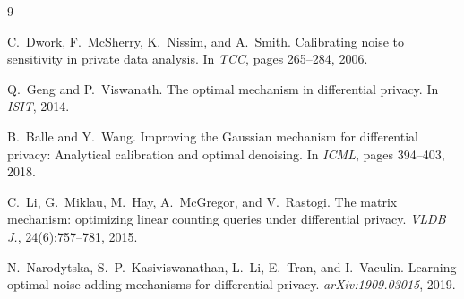 \documentclass[11pt,a4paper]{article}
\begin{document}

\begin{thebibliography}{9}

C.~Dwork, F.~McSherry, K.~Nissim, and A.~Smith.
\newblock Calibrating noise to sensitivity in private data analysis.
\newblock In \emph{TCC}, pages 265--284, 2006.

Q.~Geng and P.~Viswanath.
\newblock The optimal mechanism in differential privacy.
\newblock In \emph{ISIT}, 2014.

B.~Balle and Y.~Wang.
\newblock Improving the {G}aussian mechanism for differential privacy:
  Analytical calibration and optimal denoising.
\newblock In \emph{ICML}, pages 394--403, 2018.

C.~Li, G.~Miklau, M.~Hay, A.~McGregor, and V.~Rastogi.
\newblock The matrix mechanism: optimizing linear counting queries under
  differential privacy.
\newblock \emph{VLDB J.}, 24(6):757--781, 2015.

N.~Narodytska, S.~P.~Kasiviswanathan, L.~Li, E.~Tran, and I.~Vaculin.
\newblock Learning optimal noise adding mechanisms for differential privacy.
\newblock \emph{arXiv:1909.03015}, 2019.

\end{thebibliography}
\end{document}
